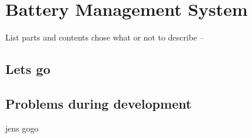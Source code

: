 \section{Battery Management System}
List parts and contents chose what or not to describe --

\subsection{Lets go}

\subsection{Problems during development}
jens gogo

